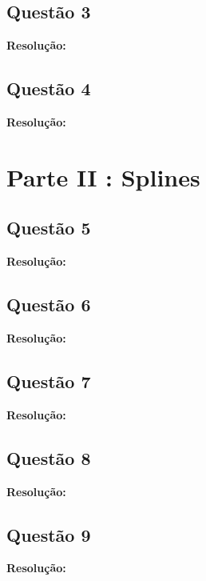 \documentclass[12pt]{article}
\begin{document}
\subsection{Questão 3}
\label{subsec:p1q3}

\textbf{Resolução:}

\subsection{Questão 4}
\label{subsec:p1q4}

\textbf{Resolução:} 

\section{Parte II : Splines}
\label{sec:parte2}

\subsection{Questão 5}
\label{subsec:p2q5}

\textbf{Resolução:}

\subsection{Questão 6}
\label{subsec:p2q6}

\textbf{Resolução:}

\subsection{Questão 7}
\label{subsec:p2q7}

\textbf{Resolução:}

\subsection{Questão 8}
\label{subsec:p2q8}

\textbf{Resolução:}

\subsection{Questão 9}
\label{subsec:p2q9}

\textbf{Resolução:} 
\end{document}
